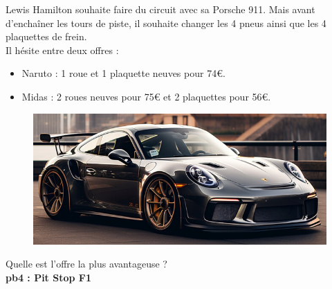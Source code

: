 \begin{multicols}{2} 

Lewis Hamilton souhaite faire du circuit avec sa Porsche 911. Mais avant d'enchaîner les tours de piste, il souhaite changer les 4 pneus ainsi que les 4 plaquettes de frein. \\

Il hésite entre deux offres : 

\begin{itemize}[label={$\bullet$}]
  \item Naruto : 1 roue et 1 plaquette neuves pour 74€.
  \item Midas : 2 roues neuves pour 75€ et 2 plaquettes pour 56€. 
\end{itemize} \columnbreak

\begin{figure}[H]
  \centering
  \includegraphics[width=0.9\linewidth]{5x2-inegalite-triangulaire/porsche.png}
\end{figure} 
\end{multicols}

Quelle est l'offre la plus avantageuse ?\\

\textbf{pb4 : Pit Stop F1} \\

